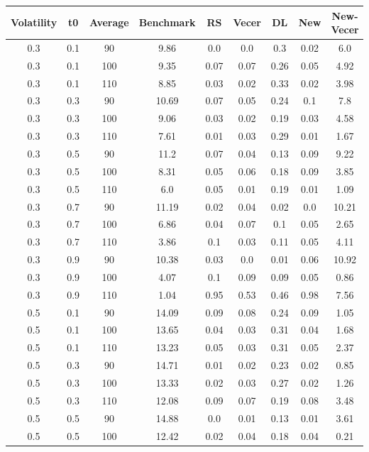 \documentclass{article}
\begin{document}
\begin{table}[H]
  \begin{tabular}{|c|c|c|c|c|c|c|c|c|}
  \hline
  Volatility & t0 & Average & Benchmark & RS & Vecer & DL & New & New-Vecer \\
  \hline
  0.3 & 0.1 & 90 & 9.86 & 0.0 & 0.0 & 0.3 & 0.02 & 6.0 \\
  0.3 & 0.1 & 100 & 9.35 & 0.07 & 0.07 & 0.26 & 0.05 & 4.92 \\
  0.3 & 0.1 & 110 & 8.85 & 0.03 & 0.02 & 0.33 & 0.02 & 3.98 \\
  0.3 & 0.3 & 90 & 10.69 & 0.07 & 0.05 & 0.24 & 0.1 & 7.8 \\
  0.3 & 0.3 & 100 & 9.06 & 0.03 & 0.02 & 0.19 & 0.03 & 4.58 \\
  0.3 & 0.3 & 110 & 7.61 & 0.01 & 0.03 & 0.29 & 0.01 & 1.67 \\
  0.3 & 0.5 & 90 & 11.2 & 0.07 & 0.04 & 0.13 & 0.09 & 9.22 \\
  0.3 & 0.5 & 100 & 8.31 & 0.05 & 0.06 & 0.18 & 0.09 & 3.85 \\
  0.3 & 0.5 & 110 & 6.0 & 0.05 & 0.01 & 0.19 & 0.01 & 1.09 \\
  0.3 & 0.7 & 90 & 11.19 & 0.02 & 0.04 & 0.02 & 0.0 & 10.21 \\
  0.3 & 0.7 & 100 & 6.86 & 0.04 & 0.07 & 0.1 & 0.05 & 2.65 \\
  0.3 & 0.7 & 110 & 3.86 & 0.1 & 0.03 & 0.11 & 0.05 & 4.11 \\
  0.3 & 0.9 & 90 & 10.38 & 0.03 & 0.0 & 0.01 & 0.06 & 10.92 \\
  0.3 & 0.9 & 100 & 4.07 & 0.1 & 0.09 & 0.09 & 0.05 & 0.86 \\
  0.3 & 0.9 & 110 & 1.04 & 0.95 & 0.53 & 0.46 & 0.98 & 7.56 \\
  0.5 & 0.1 & 90 & 14.09 & 0.09 & 0.08 & 0.24 & 0.09 & 1.05 \\
  0.5 & 0.1 & 100 & 13.65 & 0.04 & 0.03 & 0.31 & 0.04 & 1.68 \\
  0.5 & 0.1 & 110 & 13.23 & 0.05 & 0.03 & 0.31 & 0.05 & 2.37 \\
  0.5 & 0.3 & 90 & 14.71 & 0.01 & 0.02 & 0.23 & 0.02 & 0.85 \\
  0.5 & 0.3 & 100 & 13.33 & 0.02 & 0.03 & 0.27 & 0.02 & 1.26 \\
  0.5 & 0.3 & 110 & 12.08 & 0.09 & 0.07 & 0.19 & 0.08 & 3.48 \\
  0.5 & 0.5 & 90 & 14.88 & 0.0 & 0.01 & 0.13 & 0.01 & 3.61 \\
  0.5 & 0.5 & 100 & 12.42 & 0.02 & 0.04 & 0.18 & 0.04 & 0.21 \\

\end{tabular}
\end{table}
\end{document}
